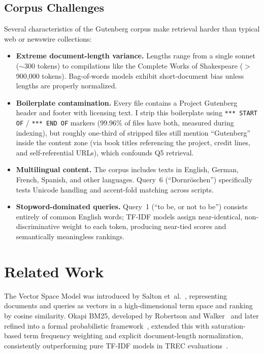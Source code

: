 \documentclass[sigconf,nonacm]{acmart}
\begin{document}
\subsection{Corpus Challenges}
Several characteristics of the Gutenberg corpus make retrieval harder than
typical web or newswire collections:
\begin{itemize}[nosep]
  \item \textbf{Extreme document-length variance.}  Lengths range from a
        single sonnet ($\sim$300 tokens) to compilations like the Complete
        Works of Shakespeare ($>$900{,}000 tokens).  Bag-of-words models
        exhibit short-document bias unless lengths are properly normalized.
  \item \textbf{Boilerplate contamination.}  Every file contains a Project
        Gutenberg header and footer with licensing text.  I strip this
        boilerplate using \texttt{*** START OF} / \texttt{*** END OF}
        markers (99.96\% of files have both, measured during indexing),
        but roughly one-third of stripped files still mention ``Gutenberg''
        inside the content zone (via book titles referencing the project,
        credit lines, and self-referential URLs), which confounds Q5 retrieval.
  \item \textbf{Multilingual content.}  The corpus includes texts in English,
        German, French, Spanish, and other languages.  Query~6
        (``Dornr\"oschen'') specifically tests Unicode handling and
        accent-fold matching across scripts.
  \item \textbf{Stopword-dominated queries.}  Query~1 (``to be, or not to
        be'') consists entirely of common English words; TF-IDF models
        assign near-identical, non-discriminative weight to each token,
        producing near-tied scores and semantically meaningless rankings.
\end{itemize}

\section{Related Work}

The Vector Space Model was introduced by Salton et~al.~\cite{salton1975vsm},
representing documents and queries as vectors in a high-dimensional term space
and ranking by cosine similarity.  Okapi BM25, developed by Robertson and
Walker~\cite{robertson1994okapi} and later refined into a formal probabilistic
framework~\cite{robertson2009bm25}, extended this with saturation-based term
frequency weighting and explicit document-length normalization, consistently
outperforming pure TF-IDF models in TREC
evaluations~\cite{robertson1995trec3}.
\end{document}
